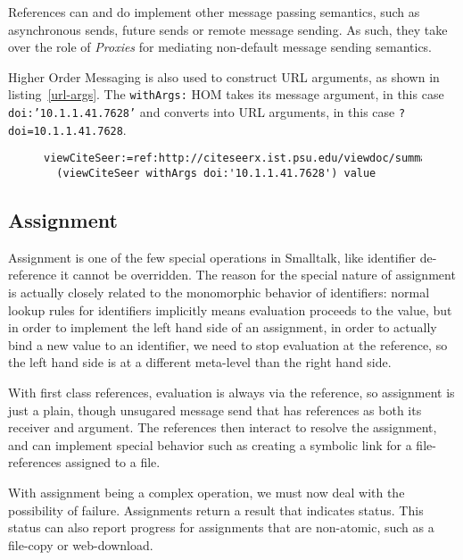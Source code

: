 \documentclass[preprint,authoryear]{llncs}
\begin{document}
References can and do implement other message passing semantics, such as asynchronous sends, future
sends or remote message sending.  As such, they take over the role of \emph{Proxies} for mediating non-default
message sending semantics.  


Higher Order Messaging is also used to construct URL arguments, as shown in listing~\ref{url-args}.  The {\tt withArgs:}
HOM takes its message argument, in this case {\tt doi:'10.1.1.41.7628'} and converts into URL arguments,
in this case {\tt ?doi=10.1.1.41.7628}.

\begin{figure}[htbp]
\begin{lstlisting}[style=L,label=url-args,caption=URL arguments via reference and higher order message.]
  viewCiteSeer:=ref:http://citeseerx.ist.psu.edu/viewdoc/summary.
  (viewCiteSeer withArgs doi:'10.1.1.41.7628') value
\end{lstlisting}
\end{figure}


\subsection{Assignment}

Assignment is one of the few special operations in Smalltalk, like identifier de-reference it cannot be overridden.
The reason for the special nature of assignment is actually closely related to the monomorphic behavior
of identifiers:  normal lookup rules for identifiers implicitly means evaluation proceeds to the value, but in order to implement the left
hand side of an assignment, in order to actually bind a new value to an identifier, we need to stop evaluation
at the reference, so the left hand side is at a different meta-level than the right hand side\cite{kay-assignment}.

With first class references, evaluation is always via the reference, so assignment is just a plain, though unsugared
message send that has references as both its receiver and argument.  The references then interact to resolve
the assignment, and can implement special behavior such as creating a symbolic link for a file-references assigned
to a file.

With assignment being a complex operation, we must now deal with the possibility of failure.  Assignments 
return a result that indicates status.  This status can also report progress for assignments that are
non-atomic, such as a file-copy or web-download.
\end{document}
